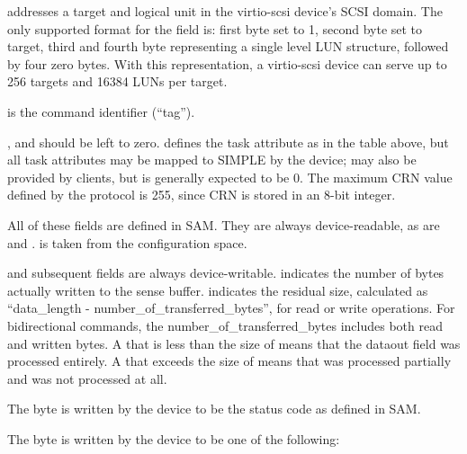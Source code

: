  addresses a target and logical unit in the
virtio-scsi device's SCSI domain. The only supported format for
the  field is: first byte set to 1, second byte set to target,
third and fourth byte representing a single level LUN structure,
followed by four zero bytes. With this representation, a
virtio-scsi device can serve up to 256 targets and 16384 LUNs per
target.

 is the command identifier (“tag”).

,  and  should be left to zero.  defines
the task attribute as in the table above, but all task attributes
may be mapped to SIMPLE by the device;  may also be provided
by clients, but is generally expected to be 0. The maximum CRN
value defined by the protocol is 255, since CRN is stored in an
8-bit integer.

All of these fields are defined in SAM. They are always
device-readable, as are  and .  is
taken from the configuration space.

 and subsequent fields are always device-writable. 
indicates the number of bytes actually written to the sense
buffer.  indicates the residual size,
calculated as “data_length - number_of_transferred_bytes”, for
read or write operations. For bidirectional commands, the
number_of_transferred_bytes includes both read and written bytes.
A  that is less than the size of  means that
the dataout field was processed entirely. A  that
exceeds the size of  means that  was
processed partially and  was not processed at
all.

The  byte is written by the device to be the status code as
defined in SAM.

The  byte is written by the device to be one of the
following:

